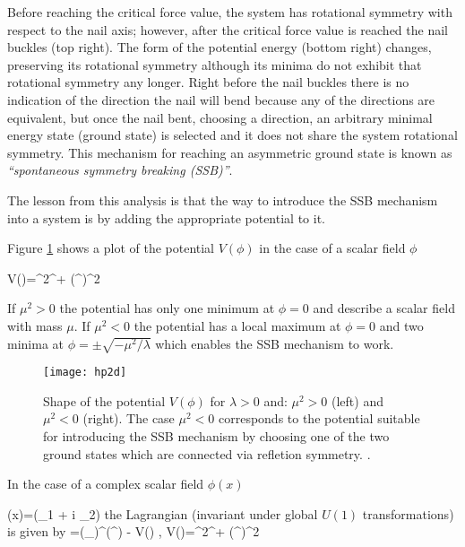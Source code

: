 \noindent Before reaching the critical force value, the system has rotational symmetry with respect to the nail axis; however, after the critical force value is reached the nail buckles (top right). The form of the potential energy (bottom right) changes, preserving its rotational symmetry although its minima do not exhibit that rotational symmetry any longer. Right before the nail buckles there is no indication of the direction the nail will bend because any of the directions are equivalent, but once the nail bent, choosing a direction, an arbitrary minimal energy state (ground state) is selected and it does not share the system rotational symmetry. This mechanism for reaching an asymmetric ground state is known as \textit{``spontaneous symmetry breaking (SSB)''}.       

\noindent The lesson from this analysis is that the way to introduce the SSB mechanism into a system is by adding the appropriate potential to it. 

\noindent Figure \ref{hp2d} shows a plot of the potential $V(\phi)$ in the case of a scalar field $\phi$

\beqn\label{Higgs_potential}
V(\phi)=\mu^2\phi^\dagger\phi + \lambda(\phi^\dagger\phi)^2
\eeqn

\noindent If $\mu^2>0$ the potential has only one minimum at $\phi=0$ and describe a scalar field with mass $\mu$. If $\mu^2<0$ the potential has a local maximum at $\phi=0$ and two minima at $\phi=\pm \sqrt{-\mu^2/\lambda}$ which enables the SSB mechanism to work. 

\begin{figure}[!h]
\centering
\texttt{[image: hp2d]}
\caption[SSB Potential form]{Shape of the potential $V(\phi)$ for $\lambda>0$ and: $\mu^2>0$ (left) and $\mu^2<0$ (right). The case $\mu^2<0$ corresponds to the potential suitable for introducing the SSB mechanism by choosing one of the two ground states which are connected via refletion symmetry. \cite{broken_symmetry}.}
\label{hp2d}
\end{figure}

\noindent In the case of a complex scalar field $\phi(x)$

\beqn\label{complex_scalar}
\phi(x)=(\phi_1 + i \phi_2)
\eeqn
\noindent the Lagrangian (invariant under global $U(1)$ transformations) is given by 
\beqn\label{higgs_potential}
\Lagr=(\partial_\mu\phi)^\dagger(\partial^\mu\phi) - V(\phi) , \qquad V(\phi)=\mu^2\phi^\dagger\phi + \lambda(\phi^\dagger\phi)^2
\eeqn

